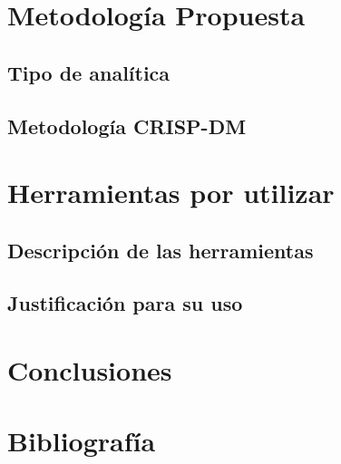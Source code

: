 \documentclass[12pt,a4paper]{article}
\begin{document}
\section{Metodología Propuesta}
\subsection{Tipo de analítica}
\subsection{Metodología CRISP-DM}
\section{Herramientas por utilizar}
\subsection{Descripción de las herramientas}
\subsection{Justificación para su uso}
\section{Conclusiones}
\newpage
\section{Bibliografía}

     
\end{document}
